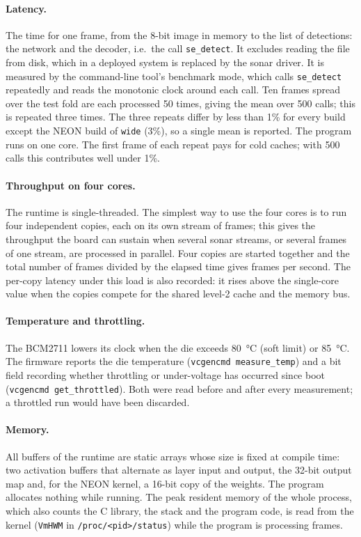 \documentclass[11pt,a4paper]{article}
\newcommand{\cfg}[1]{\texttt{#1}}
\begin{document}
\paragraph{Latency.} The time for one frame, from the 8-bit image in memory
to the list of detections: the network and the decoder, i.e.\ the call
\texttt{se\_detect}. It excludes reading the file from disk, which in a
deployed system is replaced by the sonar driver. It is measured by the
command-line tool's benchmark mode, which calls \texttt{se\_detect}
repeatedly and reads the monotonic clock around each call. Ten frames spread
over the test fold are each processed 50 times, giving the mean over 500
calls; this is repeated three times. The three repeats differ by less than
1\% for every build except the NEON build of \cfg{wide} (3\%), so a
single mean is reported. The program runs on one core. The first frame
of each repeat pays for cold caches; with 500 calls this contributes well
under 1\%.

\paragraph{Throughput on four cores.} The runtime is single-threaded. The
simplest way to use the four cores is to run four independent copies, each
on its own stream of frames; this gives the throughput the board can sustain
when several sonar streams, or several frames of one stream, are processed in
parallel. Four copies are started together and the total number of frames
divided by the elapsed time gives frames per second. The per-copy latency
under this load is also recorded: it rises above the single-core value when
the copies compete for the shared level-2 cache and the memory bus.

\paragraph{Temperature and throttling.} The BCM2711 lowers its clock when the
die exceeds \SI{80}{\celsius} (soft limit) or \SI{85}{\celsius}. The firmware
reports the die temperature (\texttt{vcgencmd measure\_temp}) and a bit field
recording whether throttling or under-voltage has occurred since boot
(\texttt{vcgencmd get\_throttled}). Both were read before and after every
measurement; a throttled run would have been discarded.

\paragraph{Memory.} All buffers of the runtime are static arrays whose size is
fixed at compile time: two activation buffers that alternate as layer input
and output, the 32-bit output map and, for the NEON kernel, a 16-bit copy of
the weights. The program allocates nothing while running. The peak resident
memory of the whole process, which also counts the C library, the stack and
the program code, is read from the kernel (\texttt{VmHWM} in
\texttt{/proc/<pid>/status}) while the program is processing frames.
\end{document}
